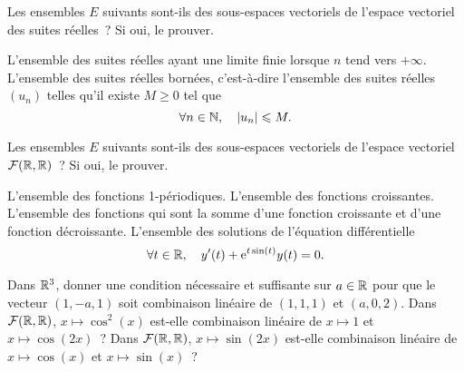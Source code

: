 \documentclass{magnolia}
\begin{document}

\begin{questions}
\question Les ensembles $E$ suivants sont-ils des sous-espaces vectoriels de l'espace vectoriel
	des suites réelles~? Si oui, le prouver.
\begin{questions}
\question L'ensemble des suites réelles ayant une limite finie lorsque $n$ tend vers
$+\infty$.
\question L'ensemble des suites réelles bornées, c'est-à-dire l'ensemble des suites
	réelles $(u_n)$ telles qu'il existe $M\geq 0$ tel que
	\[\forall n\in\mathbb{N},\quad \left|u_n\right|\leqslant M.\]
\end{questions}
\question Les ensembles $E$ suivants sont-ils des sous-espaces vectoriels de l'espace vectoriel $\mathcal{F}(\mathbb{R},\mathbb{R})$~?  Si oui, le prouver.
\begin{questions}
\question L'ensemble des fonctions 1-périodiques.
\question L'ensemble des fonctions croissantes.
\question L'ensemble des fonctions qui sont la somme d'une fonction croissante et d'une fonction
  décroissante.
\question L'ensemble des solutions de l'équation différentielle
	\[\forall t\in\mathbb{R},\quad y'(t)+{\rm e}^{t \sin(t)}y(t)=0.\]
\end{questions}
\end{questions}


\begin{questions}
\question Dans $\mathbb{R}^3$, donner une condition nécessaire et suffisante sur $a\in\mathbb{R}$ pour
  que le vecteur $(1,-a,1)$ soit combinaison linéaire de $(1,1,1)$ et $(a,0,2)$.
\question Dans $\mathcal{F}(\mathbb{R},\mathbb{R})$, $x\mapsto \cos^2(x)$ est-elle combinaison linéaire
  de $x\mapsto 1$ et $x\mapsto \cos(2x)$~?
\question Dans $\mathcal{F}(\mathbb{R},\mathbb{R})$, $x\mapsto \sin(2x)$ est-elle combinaison linéaire
de $x\mapsto \cos(x)$ et $x\mapsto \sin(x)$~? 
\end{questions}
\end{document}
